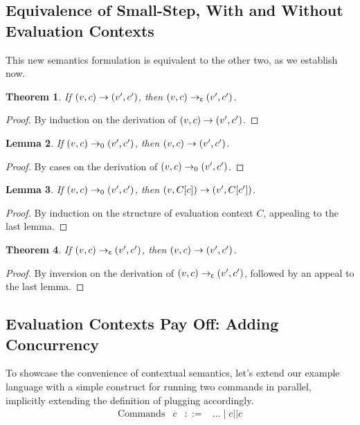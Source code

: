 \documentclass{amsbook}
\newtheorem{theorem}{Theorem}[chapter]
\newtheorem{lemma}[theorem]{Lemma}
\theoremstyle{definition}
\theoremstyle{remark}
\numberwithin{section}{chapter}
\numberwithin{equation}{chapter}
\begin{document}
\subsection{Equivalence of Small-Step, With and Without Evaluation Contexts}

This new semantics formulation is equivalent to the other two, as we establish now.

\begin{theorem}
  If $(v, c) \to (v', c')$, then $(v, c) \to_\mathsf{c} (v', c')$.
\end{theorem}

\begin{proof}
  By induction on the derivation of $(v, c) \to (v', c')$.
\end{proof}

\begin{lemma}
  If $(v, c) \to_0 (v', c')$, then $(v, c) \to (v', c')$.
\end{lemma}

\begin{proof}
  By cases on the derivation of $(v, c) \to_0 (v', c')$.
\end{proof}

\begin{lemma}
  If $(v, c) \to_0 (v', c')$, then $(v, C[c]) \to (v', C[c'])$.
\end{lemma}

\begin{proof}
  By induction on the structure of evaluation context $C$, appealing to the last lemma.
\end{proof}

\begin{theorem}
  If $(v, c) \to_\mathsf{c} (v', c')$, then $(v, c) \to (v', c')$.
\end{theorem}

\begin{proof}
  By inversion on the derivation of $(v, c) \to_\mathsf{c} (v', c')$, followed by an appeal to the last lemma.
\end{proof}

\subsection{\label{eval_contexts}Evaluation Contexts Pay Off: Adding Concurrency}

To showcase the convenience of contextual semantics, let's extend our example language with a simple construct for running two commands in parallel, implicitly extending the definition of plugging accordingly.
$$\begin{array}{rrcl}
  \textrm{Commands} & c &::=& \ldots \mid c || c
\end{array}$$
\end{document}
